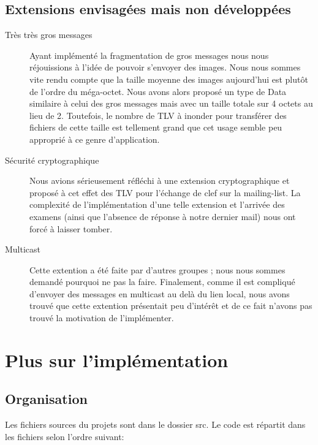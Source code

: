 \documentclass[a4paper,10pt]{article} %
\begin{document}
\subsection{Extensions envisagées mais non développées}

\begin{description}
\item[Très très gros messages] Ayant implémenté la fragmentation de gros messages nous nous réjouissions à l'idée de pouvoir s'envoyer des images. Nous nous sommes vite rendu compte que la taille moyenne des images aujourd'hui est plutôt de l'ordre du méga-octet. Nous avons alors proposé un type de Data similaire à celui des gros messages mais avec un taille totale sur 4 octets au lieu de 2. Toutefois, le nombre de TLV à inonder pour transférer des fichiers de cette taille est tellement grand que cet usage semble peu approprié à ce genre d'application.
\item[Sécurité cryptographique] Nous avions sérieusement réfléchi à une extension cryptographique et proposé à cet effet des TLV pour l'échange de clef sur la mailing-list. La complexité de l'implémentation d'une telle extension et l'arrivée des examens (ainsi que l'absence de réponse à notre dernier mail) nous ont forcé à laisser tomber.
\item[Multicast] Cette extention a été faite par d'autres groupes ; nous nous sommes demandé pourquoi ne pas la faire. Finalement, comme il est compliqué d'envoyer des messages en multicast au delà du lien local, nous avons trouvé que cette extention présentait peu d'intérêt et de ce fait n'avons pas trouvé la motivation de l'implémenter.
\end{description}

\section{Plus sur l'implémentation\label{sec:implem}}
\subsection{Organisation}

Les fichiers sources du projets sont dans le dossier \textrm{src}. Le code est répartit dans les fichiers selon l'ordre suivant:
\end{document}
